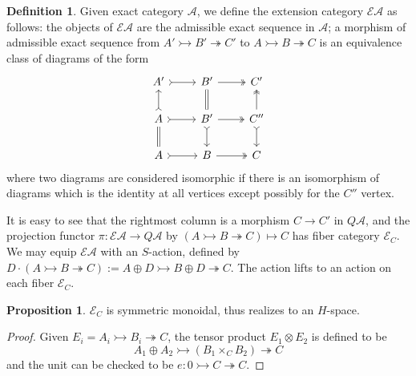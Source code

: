 \documentclass{article}
\theoremstyle{definition}
\theoremstyle{definition}
\newtheorem{definition}{Definition}[theorem]
\theoremstyle{definition}
\theoremstyle{definition}
\newtheorem{proposition}{Proposition}[theorem]
\theoremstyle{definition}
\theoremstyle{definition}
\theoremstyle{definition}
\begin{document}
\begin{tcolorbox}[colback=purple!5!white,colframe=purple!75!black]
\begin{definition}
Given exact category $\mathcal{A}$, we define the extension category $\mathcal{E}\mathcal{A}$ as follows: the objects of $\mathcal{E}\mathcal{A}$ are the admissible exact sequence in $\mathcal{A}$; a morphism of admissible exact sequence from $A'\rightarrowtail B'\twoheadrightarrow C'$ to $A\rightarrowtail B\twoheadrightarrow C$ is an equivalence class of diagrams of the form 
\[\begin{tikzcd}
	{A'} & {B'} & {C'} \\
	A & {B'} & {C''} \\
	A & B & C
	\arrow[tail, from=1-1, to=1-2]
	\arrow[two heads, from=1-2, to=1-3]
	\arrow[tail, from=2-1, to=1-1]
	\arrow[tail, from=2-1, to=2-2]
	\arrow[equal, from=2-2, to=1-2]
	\arrow[two heads, from=2-2, to=2-3]
	\arrow[tail, from=2-2, to=3-2]
	\arrow[two heads, from=2-3, to=1-3]
	\arrow[tail, from=2-3, to=3-3]
	\arrow[equal, from=3-1, to=2-1]
	\arrow[tail, from=3-1, to=3-2]
	\arrow[two heads, from=3-2, to=3-3]
\end{tikzcd}\]
where two diagrams are considered isomorphic if there is an isomorphism of diagrams which is the identity at all vertices except possibly for the $C''$ vertex. 
\end{definition}
\end{tcolorbox}
It is easy to see that the rightmost column is a morphism $C\to C'$ in $Q \mathcal{A}$, and the projection functor $\pi: \mathcal{E}\mathcal{A}\to Q \mathcal{A}$ by $(A\rightarrowtail B\twoheadrightarrow C)\mapsto C$ has fiber category $\mathcal{E}_C$. We may equip $\mathcal{E}\mathcal{A}$ with an $S$-action, defined by $ D\cdot (A\rightarrowtail B\twoheadrightarrow C):= A\oplus D\rightarrowtail B\oplus D \twoheadrightarrow C$. The action lifts to an action on each fiber $\mathcal{E}_C$.

\begin{tcolorbox}[colback=blue!5!white,colframe=blue!30!white]
\begin{proposition}
$\mathcal{E}_C$ is symmetric monoidal, thus realizes to an $H$-space.
\end{proposition}
\end{tcolorbox}
\begin{proof}
    Given $E_i=A_i\rightarrowtail B_i\twoheadrightarrow C$, the tensor product $E_1\otimes E_2$ is defined to be 
    \[A_1\oplus A_2\rightarrowtail (B_1\times_C B_2) \twoheadrightarrow C \]
    and the unit can be checked to be $e: 0\rightarrowtail C\twoheadrightarrow C$. 
\end{proof}
\end{document}
